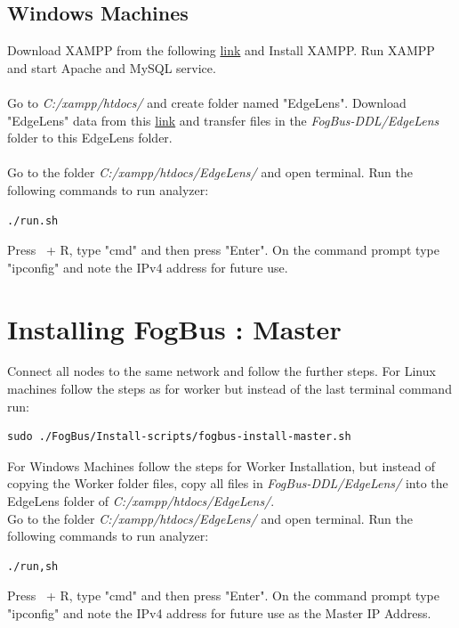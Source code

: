 \documentclass{article}
\begin{document}
\subsection{Windows Machines}
Download XAMPP from the following \href{https://www.apachefriends.org/xampp-files/7.2.6/xampp-win32-7.2.6-0-VC15-installer.exe}{link} and Install XAMPP. Run XAMPP and start Apache and MySQL service.\\ \\
Go to \textit{C:/xampp/htdocs/} and create folder named "EdgeLens". Download "EdgeLens" data from this \href{https://drive.google.com/open?id=1DZWaJHHNMrJFnsCfxoWSIpfDhK7n-qHH}{link} and transfer files in the \textit{FogBus-DDL/EdgeLens} folder to this EdgeLens folder.\\ \\
Go to the folder \textit{C:/xampp/htdocs/EdgeLens/} and open terminal. Run the following commands to run analyzer:
\begin{lstlisting}[style=BashInputStyle]
    ./run.sh
\end{lstlisting}
Press \faWindows \ + R, type "cmd" and then press "Enter". On the command prompt type "ipconfig" and note the IPv4 address for future use.

\section{Installing FogBus : Master}

Connect all nodes to the same network and follow the further steps. For Linux machines follow the steps as for worker but instead of the last terminal command run:
\begin{lstlisting}[style=BashInputStyle]
    sudo ./FogBus/Install-scripts/fogbus-install-master.sh
\end{lstlisting}

For Windows Machines follow the steps for Worker Installation, but instead of copying the Worker folder files, copy all files in \textit{FogBus-DDL/EdgeLens/} into the EdgeLens folder of \textit{C:/xampp/htdocs/EdgeLens/}.\\Go to the folder \textit{C:/xampp/htdocs/EdgeLens/} and open terminal. Run the following commands to run analyzer:
\begin{lstlisting}[style=BashInputStyle]
    ./run,sh
\end{lstlisting}
Press \faWindows \ + R, type "cmd" and then press "Enter". On the command prompt type "ipconfig" and note the IPv4 address for future use as the Master IP Address.
\end{document}
